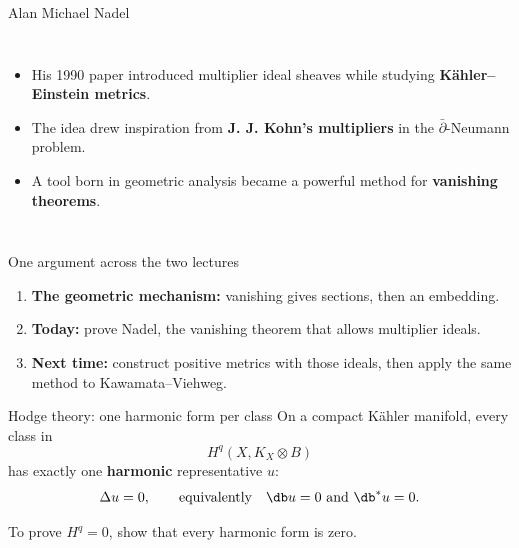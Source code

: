 \begin{frame}{Alan Michael Nadel}
\begin{columns}[c]
\centering
{}
\begin{itemize}
\setlength{\itemsep}{16pt}
\item His 1990 paper introduced multiplier ideal sheaves while studying \textbf{Kähler--Einstein metrics}.
\item The idea drew inspiration from \textbf{J. J. Kohn's multipliers} in the $\bar\partial$-Neumann problem.
\item A tool born in geometric analysis became a powerful method for \textbf{vanishing theorems}.
\end{itemize}
\end{columns}
\end{frame}

\begin{frame}{One argument across the two lectures}
\begin{enumerate}
\setlength{\itemsep}{15pt}
\item \textbf{The geometric mechanism:} vanishing gives sections, then an embedding.
\item \textbf{Today:} prove Nadel, the vanishing theorem that allows multiplier ideals.
\item \textbf{Next time:} construct positive metrics with those ideals, then apply the same method to Kawamata--Viehweg.
\end{enumerate}
\end{frame}

\begin{frame}{Hodge theory: one harmonic form per class}
On a compact Kähler manifold, every class in
\[
H^q(X,K_X\otimes B)
\]
has exactly one \textbf{harmonic} representative \(u\):
\[
\Delta u=0,\qquad\text{equivalently}\quad \db u=0\ \text{and}\ \db^*u=0.
\]
\par\bigskip
\begin{center}
\large To prove \(H^q=0\), show that every harmonic form is zero.
\end{center}
\end{frame}

